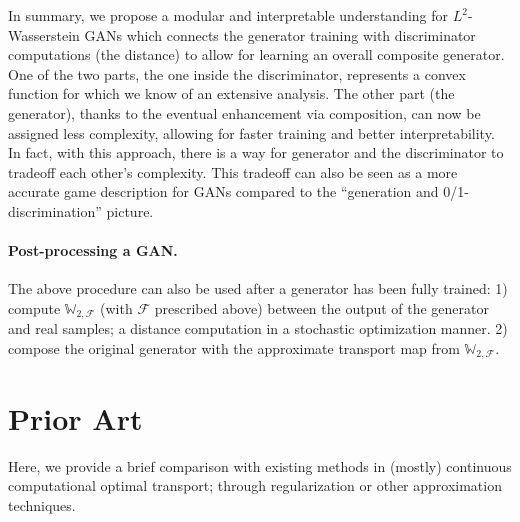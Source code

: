 \documentclass[10pt]{article}
\newcommand{\W}{\mathds{W}}
\newcommand{\calF}{\mathcal{F}}
\numberwithin{equation}{section}
\begin{document}
In summary, we propose a modular and interpretable understanding for $L^2$-Wasserstein GANs which connects the generator training with discriminator computations (the distance) to allow for learning an overall composite generator. One of the two parts, the one inside the discriminator, represents a convex function for which we know of an extensive analysis. The other part (the generator), thanks to the eventual enhancement via composition, can now be assigned less complexity, allowing for faster training and better interpretability. In fact, with this approach, there is a way for generator and the discriminator to tradeoff each other’s complexity. This tradeoff can also be seen as a more accurate game description for GANs compared to the ``generation and 0/1-discrimination'' picture. 

\paragraph{Post-processing a GAN.}
The above procedure can also be used after a generator has been fully trained: 1) compute $\W_{2,\calF}$ (with $\calF$ prescribed above) between the output of the generator and real samples; a distance computation in a stochastic optimization manner. 2) compose the original generator with the approximate transport map from $\W_{2,\calF}$.

\section{Prior Art}\label{sec:prior}
Here, we provide a brief comparison with existing methods in (mostly) continuous computational optimal transport; through regularization or other approximation techniques. 
\end{document}

